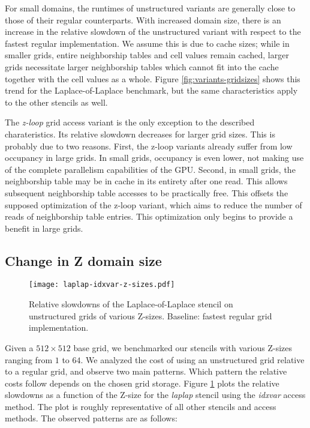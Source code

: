For small domains, the runtimes of unstructured variants are generally close to those of their regular counterparts. With increased domain size, there is an increase in the relative slowdown of the unstructured variant with respect to the fastest regular implementation. We assume this is due to cache sizes; while in smaller grids, entire neighborship tables and cell values remain cached, larger grids necessitate larger neighborship tables which cannot fit into the cache together with the cell values as a whole. Figure \ref{fig:variants-gridsizes} shows this trend for the Laplace-of-Laplace benchmark, but the same characteristics apply to the other stencils as well.

The \emph{z-loop} grid access variant is the only exception to the described charateristics. Its relative slowdown decreases for larger grid sizes. This is probably due to two reasons. First, the z-loop variants already suffer from low occupancy in large grids. In small grids, occupancy is even lower, not making use of the complete parallelism capabilities of the GPU. Second, in small grids, the neighborship table may be in cache in its entirety after one read. This allows subsequent neighborship table accesses to be practically free. This offsets the supposed optimization of the z-loop variant, which aims to reduce the number of reads of neighborship table entries. This optimization only begins to provide a benefit in large grids.

\subsection{Change in Z domain size}
\label{sec:res-z-size-change}

\begin{figure}
	\texttt{[image: laplap-idxvar-z-sizes.pdf]}
	\caption{\label{fig:laplap-z-sizes} Relative slowdowns of the Laplace-of-Laplace stencil on unstructured grids of various Z-sizes. Baseline: fastest regular grid implementation.}
\end{figure}

Given a $512\times 512$ base grid, we benchmarked our stencils with various Z-sizes ranging from $1$ to $64$. We analyzed the cost of using an unstructured grid relative to a regular grid, and observe two main patterns. Which pattern the relative costs follow depends on the chosen grid storage. Figure \ref{fig:laplap-z-sizes} plots the relative slowdowns as a function of the Z-size for the \emph{laplap} stencil using the \emph{idxvar} access method. The plot is roughly representative of all other stencils and access methods. The observed patterns are as follows:

